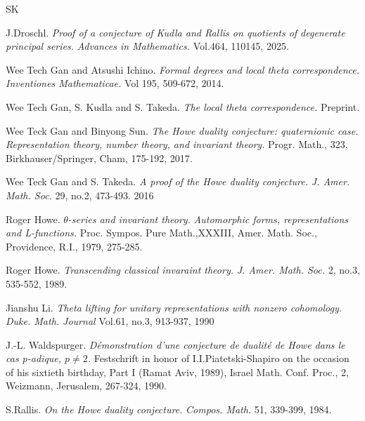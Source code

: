 \documentclass[twoside]{amsart}
\theoremstyle{plain}
\numberwithin{equation}{section}
\begin{document}
\begin{thebibliography}{SK}


J.Droschl. {\em Proof of a conjecture of Kudla and Rallis on quotients of degenerate principal series.}  \textit{Advances in Mathematics.} Vol.464, 110145, 2025.

Wee Tech Gan and Atsushi Ichino. {\em Formal degrees and local theta correspondence.} \textit{Inventiones Mathematicae.} Vol 195, 509-672, 2014.

Wee Tech Gan, S. Kudla and S. Takeda. {\em The local theta correspondence.} Preprint.

Wee Teck Gan and Binyong Sun. {\em The Howe duality conjecture: quaternionic case.} \textit{Representation theory, number theory, and invariant theory.} Progr. Math., 323, Birkhauser/Springer, Cham, 175-192, 2017.

Wee Teck Gan and S. Takeda. {\em A proof of the Howe duality conjecture.} \textit{J. Amer. Math. Soc.} 29, no.2, 473-493. 2016

Roger Howe. {\em $\theta$-series and invariant theory.} \textit{Automorphic forms, representations and L-functions.} Proc. Sympos. Pure Math.,XXXIII, Amer. Math. Soc., Providence, R.I., 1979, 275-285.

Roger Howe. {\em Transcending classical invaraint theory.} \textit{J. Amer. Math. Soc.} 2, no.3, 535-552, 1989.

Jianshu Li. {\em Theta lifting for unitary representations with nonzero cohomology.} \textit{Duke. Math. Journal} Vol.61, no.3, 913-937, 1990


J.-L. Waldspurger. {\em Démonstration d’une conjecture de dualité de Howe dans le cas p-adique, $p\neq 2$.} Festschrift in honor of I.I.Piatetski-Shapiro on the occasion of his sixtieth birthday, Part I (Ramat Aviv, 1989), Israel Math. Conf. Proc., 2, Weizmann, Jerusalem, 267-324, 1990.

S.Rallis. {\em On the Howe duality conjecture.} \textit{Compos. Math.} 51, 339-399, 1984.

\end{thebibliography}
\end{document}
